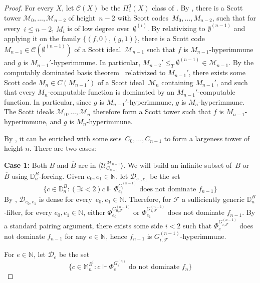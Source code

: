 \documentclass{article}
\def\NN{\mathbb{N}}
\def\DD{\mathbb{D}}
\def\MM{\mathbb{M}}
\def\F{\mathcal{F}}
\def\U{\mathcal{U}}
\def\C{\mathcal{C}}
\def\D{\mathcal{D}}
\def\M{\mathcal{M}}
\numberwithin{theorem}{section}
\theoremstyle{definition}
\begin{document}
\begin{proof}
For every $X$, let $\C(X)$ be the $\Pi^0_1(X)$ class of .
By , there is a Scott tower $\M_0, \dots, \M_{n-2}$ of height~$n-2$ with Scott codes~$M_0, \dots, M_{n-2}$, such that for every~$i \leq n-2$, $M_i$ is of low degree over~$\emptyset^{(i)}$.
By relativizing  to $\emptyset^{(n-1)}$ and applying it on the family $\{(f,0),(g,1)\}$, there is a Scott code~$M_{n-1} \in \C(\emptyset^{(n-1)})$ of a Scott ideal~$\M_{n-1}$ such that $f$ is $M_{n-1}$-hyperimmune and $g$ is $M_{n-1}'$-hyperimmune. In particular, $M_{n-2}' \leq_T \emptyset^{(n-1)} \in \M_{n-1}$.
By the computably dominated basis theorem~\cite{jockusch1972classes} relativized to $M_{n-1}'$, there exists some Scott code $M_n \in C(M_{n-1}')$ of a Scott ideal~$\M_n$ containing $M_{n-1}'$, and such that every $M_n$-computable function is dominated by an $M_{n-1}'$-computable function. In particular, since $g$ is $M_{n-1}'$-hyperimmune, $g$ is $M_n$-hyperimmune. The Scott ideals $\M_0, \dots, \M_n$ therefore form a Scott tower such that $f$ is $M_{n-1}$-hyperimmune, and $g$ is $M_n$-hyperimmune.

By , it can be enriched with some sets~$C_0, \dots, C_{n-1}$ to form a largeness tower of height $n$. There are two cases:
\bigskip

\textbf{Case 1:} Both $B$ and $\overline{B}$ are in $\langle \U_{C_{n-1}}^{\M_{n-1}} \rangle$. We will build an infinite subset of~$B$ or $\overline{B}$ using $\DD_n^B$-forcing.
Given $e_0,e_1 \in \NN$, let $\D_{e_0,e_1}$ be the set 
$$\{c \in \DD_n^B : (\exists i < 2) c \Vdash \Phi_{e_i}^{G_i^{(n-1)}} \mbox{ does not dominate } f_{n-1} \}$$
By , $\D_{e_0,e_1}$ is dense for every~$e_0, e_1 \in \NN$.
Therefore, for $\F$ a sufficiently generic $\DD_n^B$-filter, for every $e_0,e_1 \in \NN$, either $\Phi_{e_0}^{G_{0,\F}^{(n-1)}}$ or $\Phi_{e_1}^{G_{1,\F}^{(n-1)}}$ does not dominate $f_{n-1}$. By a standard pairing argument, there exists some side $i < 2$ such that $\Phi_{e}^{G_{i,\F}^{(n-1)}}$ does not dominate $f_{n-1}$ for any $e \in \NN$, hence $f_{n-1}$ is $G_{i,\F}^{(n-1)}$-hyperimmune. 

For $e \in \NN$, let $\D_e$ be the set
$$\{c \in \MM^{B^i}_n : c \Vdash \Phi_{e}^{G_i^{(n)}} \mbox{ do not dominate } f_n \}$$


\end{proof}
\end{document}
